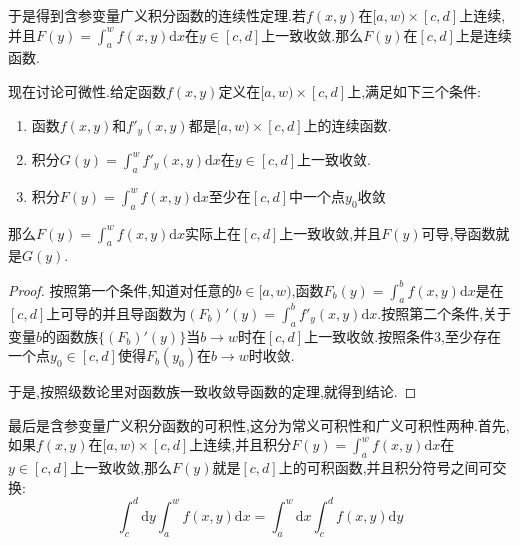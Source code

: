 于是得到含参变量广义积分函数的连续性定理.若$f(x,y)$在$[a,w)\times[c,d]$上连续,并且$F(y)=\int_a^wf(x,y)\mathrm{d}x$在$y\in[c,d]$上一致收敛.那么$F(y)$在$[c,d]$上是连续函数.

现在讨论可微性.给定函数$f(x,y)$定义在$[a,w)\times[c,d]$上,满足如下三个条件:\begin{enumerate}
	\item 函数$f(x,y)$和$f'_y(x,y)$都是$[a,w)\times[c,d]$上的连续函数.
	\item 积分$G(y)=\int_a^wf'_y(x,y)\mathrm{d}x$在$y\in[c,d]$上一致收敛.
	\item 积分$F(y)=\int_a^wf(x,y)\mathrm{d}x$至少在$[c,d]$中一个点$y_0$收敛
\end{enumerate}

那么$F(y)=\int_a^wf(x,y)\mathrm{d}x$实际上在$[c,d]$上一致收敛,并且$F(y)$可导,导函数就是$G(y)$.
\begin{proof}
	
	按照第一个条件,知道对任意的$b\in[a,w)$,函数$F_b(y)=\int_a^bf(x,y)\mathrm{d}x$是在$[c,d]$上可导的并且导函数为$(F_b)'(y)=\int_a^bf'_y(x,y)\mathrm{d}x$.按照第二个条件,关于变量$b$的函数族$\{(F_b)'(y)\}$当$b\to w$时在$[c,d]$上一致收敛.按照条件3,至少存在一个点$y_0\in[c,d]$使得$F_b(y_0)$在$b\to w$时收敛.
	
	于是,按照级数论里对函数族一致收敛导函数的定理,就得到结论.
	
\end{proof}

最后是含参变量广义积分函数的可积性,这分为常义可积性和广义可积性两种.首先,如果$f(x,y)$在$[a,w)\times[c,d]$上连续,并且积分$F(y)=\int_a^wf(x,y)\mathrm{d}x$在$y\in[c,d]$上一致收敛,那么$F(y)$就是$[c,d]$上的可积函数,并且积分符号之间可交换:
$$\int_c^d\mathrm{d}y\int_a^wf(x,y)\mathrm{d}x=\int_a^w\mathrm{d}x\int_c^df(x,y)\mathrm{d}y$$

